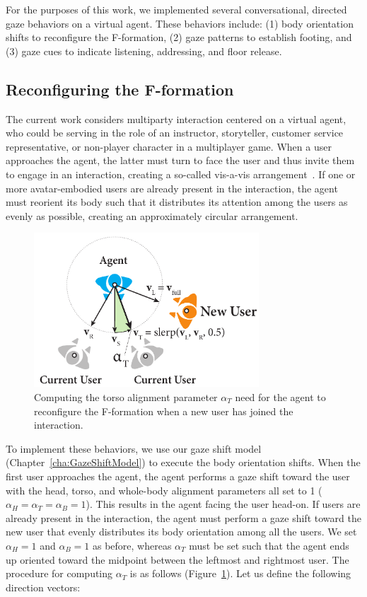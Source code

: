 For the purposes of this work, we implemented several conversational, directed gaze behaviors on a virtual agent. These behaviors include: (1) body orientation shifts to reconfigure the F-formation, (2) gaze patterns to establish footing, and (3) gaze cues to indicate listening, addressing, and floor release.

\subsection{Reconfiguring the F-formation}

The current work considers multiparty interaction centered on a virtual agent, who could be serving in the role of an instructor, storyteller, customer service representative, or non-player character in a multiplayer game. When a user approaches the agent, the latter must turn to face the user and thus invite them to engage in an interaction, creating a so-called vis-a-vis arrangement~\cite{kendon1990conducting}. If one or more avatar-embodied users are already present in the interaction, the agent must reorient its body such that it distributes its attention among the users as evenly as possible, creating an approximately circular arrangement.

\begin{figure}
\centering
\includegraphics[width=0.75\textwidth]{conversationalrolegaze/Figures/FTorsoAlign.pdf}
\caption{Computing the torso alignment parameter $\alpha_T$ need for the agent to reconfigure the F-formation when a new user has joined the interaction.}
\label{fig:FTorsoAlign}
\end{figure}

To implement these behaviors, we use our gaze shift model (Chapter~\ref{cha:GazeShiftModel}) to execute the body orientation shifts. When the first user approaches the agent, the agent performs a gaze shift toward the user with the head, torso, and whole-body alignment parameters all set to 1 ($\alpha_H = \alpha_T = \alpha_B = 1$). This results in the agent facing the user head-on. If users are already present in the interaction, the agent must perform a gaze shift toward the new user that evenly distributes its body orientation among all the users. We set $\alpha_H = 1$ and $\alpha_B = 1$ as before, whereas $\alpha_T$ must be set such that the agent ends up oriented toward the midpoint between the leftmost and rightmost user. The procedure for computing $\alpha_T$ is as follows (Figure~\ref{fig:FTorsoAlign}). Let us define the following direction vectors:

